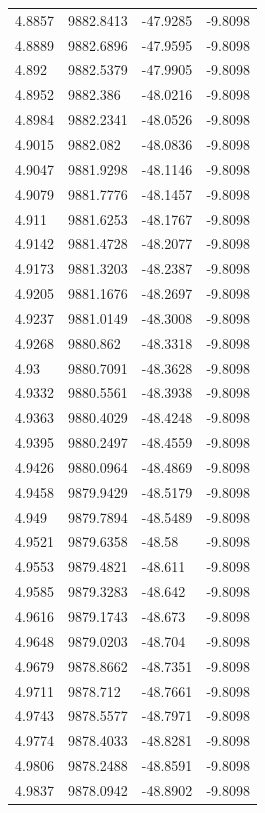 \begin{table}[H]
\begin{tabular}{llll}
4.8857 & 9882.8413 & -47.9285 & -9.8098 \\
4.8889 & 9882.6896 & -47.9595 & -9.8098 \\
4.892 & 9882.5379 & -47.9905 & -9.8098 \\
4.8952 & 9882.386 & -48.0216 & -9.8098 \\
4.8984 & 9882.2341 & -48.0526 & -9.8098 \\
4.9015 & 9882.082 & -48.0836 & -9.8098 \\
4.9047 & 9881.9298 & -48.1146 & -9.8098 \\
4.9079 & 9881.7776 & -48.1457 & -9.8098 \\
4.911 & 9881.6253 & -48.1767 & -9.8098 \\
4.9142 & 9881.4728 & -48.2077 & -9.8098 \\
4.9173 & 9881.3203 & -48.2387 & -9.8098 \\
4.9205 & 9881.1676 & -48.2697 & -9.8098 \\
4.9237 & 9881.0149 & -48.3008 & -9.8098 \\
4.9268 & 9880.862 & -48.3318 & -9.8098 \\
4.93 & 9880.7091 & -48.3628 & -9.8098 \\
4.9332 & 9880.5561 & -48.3938 & -9.8098 \\
4.9363 & 9880.4029 & -48.4248 & -9.8098 \\
4.9395 & 9880.2497 & -48.4559 & -9.8098 \\
4.9426 & 9880.0964 & -48.4869 & -9.8098 \\
4.9458 & 9879.9429 & -48.5179 & -9.8098 \\
4.949 & 9879.7894 & -48.5489 & -9.8098 \\
4.9521 & 9879.6358 & -48.58 & -9.8098 \\
4.9553 & 9879.4821 & -48.611 & -9.8098 \\
4.9585 & 9879.3283 & -48.642 & -9.8098 \\
4.9616 & 9879.1743 & -48.673 & -9.8098 \\
4.9648 & 9879.0203 & -48.704 & -9.8098 \\
4.9679 & 9878.8662 & -48.7351 & -9.8098 \\
4.9711 & 9878.712 & -48.7661 & -9.8098 \\
4.9743 & 9878.5577 & -48.7971 & -9.8098 \\
4.9774 & 9878.4033 & -48.8281 & -9.8098 \\
4.9806 & 9878.2488 & -48.8591 & -9.8098 \\
4.9837 & 9878.0942 & -48.8902 & -9.8098 \\

\end{tabular}
\end{table}
